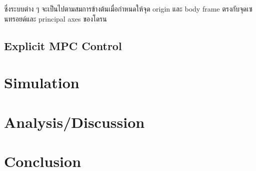 \documentclass{classes/fiboReport}
\begin{document}
ซึ่งระบบต่าง ๆ จะเป็นไปตามสมการข้างต้นเมื่อกำหนดให้จุด origin และ body frame ตรงกับจุดเซนทรอยด์และ principal axes ของโดรน

\section{Explicit MPC Control}


\chapter{Simulation}

\chapter{Analysis/Discussion}
\chapter{Conclusion}


\nocite{*}


\end{document}
